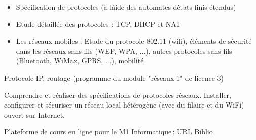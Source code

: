 {
\begin{itemize}
\item Spécification de protocoles (à l\'aide des automates d\'états finis étendus)
\item Etude détaillée des protocoles : TCP, DHCP et NAT
\item Les réseaux mobiles : Etude du protocole 802.11 (wifi), éléments de sécurité dans les réseaux sans fils (WEP, WPA, ...),
autres protocoles sans fils (Bluetooth, WiMax, GPRS, ...), mobilité
\end{itemize}
} 
{Protocole IP, routage (programme du module "réseaux 1" de licence 3)
} 
{ 
\begin{itemize}
\ObjItem Comprendre et réaliser des spécifications de protocoles réseaux.
\ObjItem Installer, configurer et sécuriser un réseau local hétérogène (avec du filaire et du WiFi) ouvert sur Internet.
\end{itemize} 
} 
{Plateforme de cours en ligne pour le M1 Informatique\,: URL} 
{Biblio} 
 
\vfill

